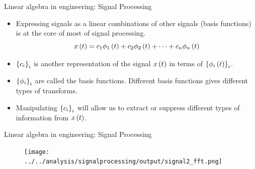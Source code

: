 \documentclass[aspectratio=169]{beamer}
\let\olditem\item
\renewcommand{\item}{\setlength{\itemsep}{\fill}\olditem}
\def\lp{\ensuremath\left(}
\def\rp{\ensuremath\right)}
\def\lc{\ensuremath\left\{}
\def\rc{\ensuremath\right\}}
\newcommand{\ct}[1]{\lp #1\rp}
\begin{document}
\begin{frame}{Linear algebra in engineering: Signal Processing}
  \begin{itemize}
    \item Expressing signals as a linear combinations of other signals (basis functions) is at the core of most of signal processing.
    \[ x\ct{t} = c_1 \phi_1\ct{t} + c_2 \phi_2\ct{t} + \cdots + c_n \phi_n\ct{t} \]

    \item $\lc c_i \rc_{i}$ is another representation of the signal $x\ct{t}$ in terms of $\lc \phi_i\ct{t} \rc_i$.
    
    \item $\lc \phi_i \rc_{i}$ are called the basis functions.  Different basis functions gives different types of transforms.
    
    \item Manipulating $\lc c_i \rc_i$ will allow us to extract or suppress different types of information from $x\ct{t}$.
  \end{itemize}
\end{frame}


\begin{frame}{Linear algebra in engineering: Signal Processing}
  \begin{figure}
    \centering
    \texttt{[image: ../../analysis/signalprocessing/output/signal2\_fft.png]}
  \end{figure}
\end{frame}
\end{document}
